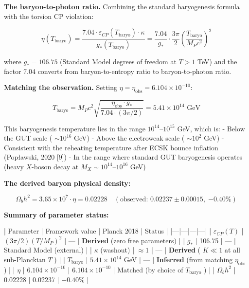 \documentclass[11pt,a4paper]{article}
\theoremstyle{definition}
\theoremstyle{remark}
\begin{document}
\textbf{The baryon-to-photon ratio.} Combining the standard baryogenesis formula with the torsion CP violation:


\begin{equation}
\boxed{\eta(T_{\text{baryo}}) = \frac{7.04 \cdot \varepsilon_{CP}(T_{\text{baryo}}) \cdot \kappa}{g_*(T_{\text{baryo}})} = \frac{7.04}{g_*} \cdot \frac{3\pi}{2} \left(\frac{T_{\text{baryo}}}{M_P c^2}\right)^2}
\end{equation}


where $g_* = 106.75$ (Standard Model degrees of freedom at $T > 1$ TeV) and the factor 7.04 converts from baryon-to-entropy ratio to baryon-to-photon ratio.

\textbf{Matching the observation.} Setting $\eta = \eta_{\text{obs}} = 6.104 \times 10^{-10}$:


\begin{equation}
T_{\text{baryo}} = M_P c^2 \sqrt{\frac{\eta_{\text{obs}} \cdot g_*}{7.04 \cdot (3\pi/2)}} = 5.41 \times 10^{14} \text{ GeV}
\end{equation}


This baryogenesis temperature lies in the range $10^{14}$–$10^{15}$ GeV, which is:
- Below the GUT scale ( $\sim 10^{16}$ GeV)
- Above the electroweak scale ( $\sim 10^{2}$ GeV)
- Consistent with the reheating temperature after ECSK bounce inflation (Popławski, 2020 [9])
- In the range where standard GUT baryogenesis operates (heavy $X$-boson decay at $M_X \sim 10^{14}$–$10^{16}$ GeV)

\textbf{The derived baryon physical density:}


\begin{equation}
\boxed{\Omega_b h^2 = 3.65 \times 10^7 \cdot \eta = 0.02228 \quad (\text{observed: } 0.02237 \pm 0.00015, \; \mathbf{-0.40\%})}
\end{equation}


\textbf{Summary of parameter status:}

| Parameter | Framework value | Planck 2018 | Status |
|---|---|---|---|
| $\varepsilon_{CP}(T)$ | $(3\pi/2)(T/M_P)^2$ | — | \textbf{Derived} (zero free parameters) |
| $g_*$ | 106.75 | — | Standard Model (external) |
| $\kappa$ (washout) | $\approx 1$ | — | \textbf{Derived} ( $K \ll 1$ at all sub-Planckian $T$ ) |
| $T_{\text{baryo}}$ | $5.41 \times 10^{14}$ GeV | — | \textbf{Inferred} (from matching $\eta_{\text{obs}}$ ) |
| $\eta$ | $6.104 \times 10^{-10}$ | $6.104 \times 10^{-10}$ | Matched (by choice of $T_{\text{baryo}}$ ) |
| $\Omega_b h^2$ | 0.02228 | 0.02237 | $-0.40\%$ |
\end{document}
